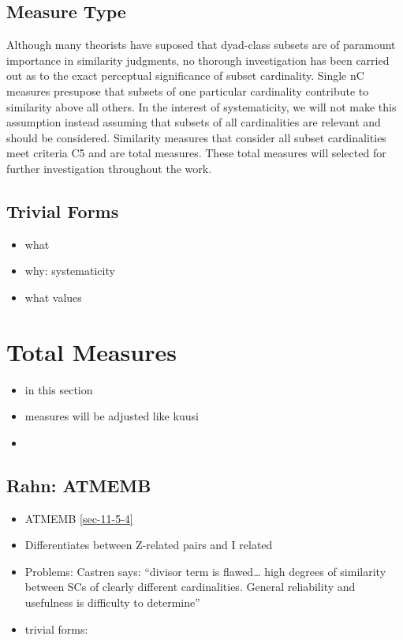 \documentclass{article}
\begin{document}
\subsection{Measure Type}
\label{sec-6-4}

Although many theorists have suposed that dyad-class subsets are of
paramount importance in similarity judgments, no thorough
investigation has been carried out as to the exact perceptual
significance of subset cardinality. Single nC measures presupose that
subsets of one particular cardinality contribute to similarity above
all others. In the interest of systematicity, we will not make this
assumption instead assuming that subsets of all cardinalities are
relevant and should be considered. Similarity measures that consider
all subset cardinalities meet criteria C5 and are total
measures. These total measures will selected for further investigation
throughout the work.
\subsection{Trivial Forms}
\label{sec-6-5}

\begin{itemize}
\item what
\item why: systematicity
\item what values
\end{itemize}
\section{Total Measures}
\label{sec-7}

\begin{itemize}
\item in this section
\item measures will be adjusted like kuusi
\item 
\end{itemize}
\subsection{Rahn: ATMEMB}
\label{sec-7-1}

\begin{itemize}
\item ATMEMB \ref{sec-11-5-4}
\item Differentiates between Z-related pairs and I related
\item Problems: Castren says: ``divisor term is flawed\ldots{} high degrees of
  similarity between SCs of clearly different cardinalities. General
  reliability and usefulness is difficulty to determine''
\item trivial forms:
\end{itemize}
\end{document}
